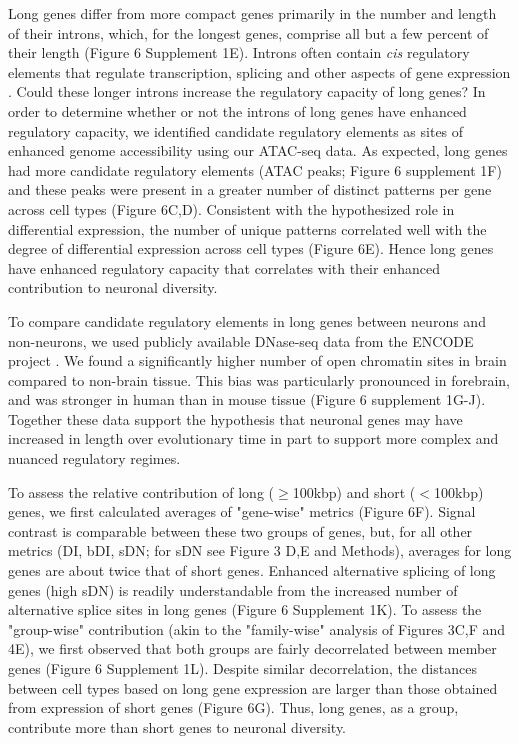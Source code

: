 Long genes differ from more compact genes primarily in the number and length of their introns, which, for the longest genes, comprise all but a few percent of their length (Figure 6 Supplement 1E). Introns often contain \textit{cis} regulatory elements that regulate transcription, splicing and other aspects of gene expression \citep{Rebollo_2012,Friedli_2015}. Could these longer introns increase the regulatory capacity of long genes? In order to determine whether or not the introns of long genes have enhanced regulatory capacity, we identified candidate regulatory elements as sites of enhanced genome accessibility using our ATAC-seq data. As expected, long genes had more candidate regulatory elements (ATAC peaks; Figure 6 supplement 1F) and these peaks were present in a greater number of distinct patterns per gene across cell types (Figure 6C,D). Consistent with the hypothesized role in differential expression, the number of unique patterns correlated well with the degree of differential expression across cell types (Figure 6E). Hence long genes have enhanced regulatory capacity that correlates with their enhanced contribution to neuronal diversity.

To compare candidate regulatory elements in long genes between neurons and non-neurons, we used publicly available DNase-seq data from the ENCODE project \citep{Dunham_2012}. We found a significantly higher number of open chromatin sites in brain compared to non-brain tissue. This bias was particularly pronounced in forebrain, and was stronger in human than in mouse tissue (Figure 6 supplement 1G-J). Together these data support the hypothesis that neuronal genes may have increased in length over evolutionary time in part to support more complex and nuanced regulatory regimes. 

To assess the relative contribution of long ($\geq$100kbp) and short ($<$100kbp) genes, we first calculated averages of "gene-wise" metrics (Figure 6F). Signal contrast is comparable between these two groups of genes, but, for all other metrics (DI, bDI, sDN; for sDN see Figure 3 D,E and Methods), averages for long genes are about twice that of short genes. Enhanced alternative splicing of long genes (high sDN) is readily understandable from the increased number of alternative splice sites in long genes (Figure 6 Supplement 1K). To assess the "group-wise" contribution (akin to the "family-wise" analysis of Figures 3C,F and 4E), we first observed that both groups are fairly decorrelated between member genes (Figure 6 Supplement 1L). Despite similar decorrelation, the distances between cell types based on long gene expression are larger than those obtained from expression of short genes (Figure 6G). Thus, long genes, as a group, contribute more than short genes to neuronal diversity. 








